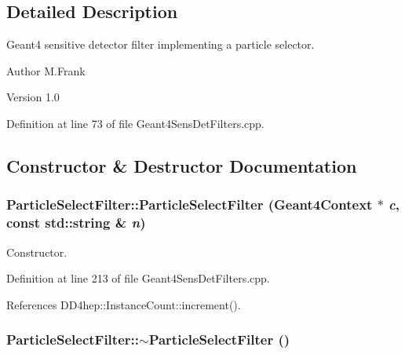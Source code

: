 \subsection{Detailed Description}
Geant4 sensitive detector filter implementing a particle selector. \begin{DoxyAuthor}{Author}
M.Frank 
\end{DoxyAuthor}
\begin{DoxyVersion}{Version}
1.0 
\end{DoxyVersion}


Definition at line 73 of file Geant4SensDetFilters.cpp.

\subsection{Constructor \& Destructor Documentation}
\hypertarget{struct_d_d4hep_1_1_simulation_1_1_particle_select_filter_a02e58fea6995a7e71f4ea2ea3bb4696e}{
\subsubsection[{ParticleSelectFilter}]{\setlength{\rightskip}{0pt plus 5cm}ParticleSelectFilter::ParticleSelectFilter ({\bf Geant4Context} $\ast$ {\em c}, \/  const std::string \& {\em n})}}
\label{struct_d_d4hep_1_1_simulation_1_1_particle_select_filter_a02e58fea6995a7e71f4ea2ea3bb4696e}


Constructor. 

Definition at line 213 of file Geant4SensDetFilters.cpp.

References DD4hep::InstanceCount::increment().\hypertarget{struct_d_d4hep_1_1_simulation_1_1_particle_select_filter_aee798c7febdef997d9288130d8c08d0f}{
\subsubsection[{$\sim$ParticleSelectFilter}]{\setlength{\rightskip}{0pt plus 5cm}ParticleSelectFilter::$\sim$ParticleSelectFilter ()}}
\label{struct_d_d4hep_1_1_simulation_1_1_particle_select_filter_aee798c7febdef997d9288130d8c08d0f}


